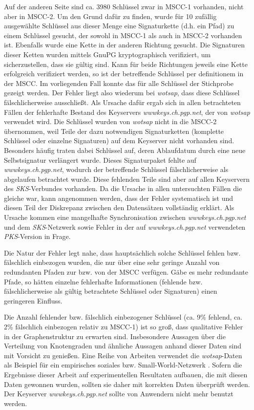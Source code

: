 Auf der anderen Seite sind ca. 3980 Schlüssel zwar in MSCC-1
vorhanden, nicht aber in MSCC-2. Um den Grund dafür zu finden, wurde
für 10 zufällig ausgewählte Schlüssel aus dieser Menge eine
Signaturkette (d.h. ein Pfad) zu einem Schlüssel gesucht, der sowohl
in MSCC-1 als auch in MSCC-2 vorhanden ist. Ebenfalls wurde eine Kette
in der anderen Richtung gesucht. Die Signaturen dieser Ketten wurden
mittels GnuPG kryptographisch verifiziert, um sicherzustellen, dass
sie gültig sind. Kann für beide Richtungen jeweils eine Kette
erfolgreich verifiziert werden, so ist der betreffende Schlüssel per
definitionem in der MSCC. Im vorliegenden Fall konnte das für alle
Schlüssel der Stichprobe gezeigt werden. Der Fehler liegt also
wiederum bei \emph{wotsap}, dass diese Schlüssel fälschlicherweise
ausschließt. Als Ursache dafür ergab sich in allen betrachteten
Fällen der fehlerhafte Bestand des Keyservers
\emph{wwwkeys.ch.pgp.net}, der von \emph{wotsap} verwendet wird. Die
Schlüssel wurden von \emph{wotsap} nicht in die MSCC-2 übernommen,
weil Teile der dazu notwendigen Signaturketten (komplette Schlüssel
oder einzelne Signaturen) auf dem Keyserver nicht vorhanden
sind. Besonders häufig traten dabei Schlüssel auf, deren
Ablaufdatum durch eine neue Selbstsignatur verlängert wurde. Dieses
Signaturpaket fehlte auf \emph{wwwkeys.ch.pgp.net}, wodurch der
betreffende Schlüssel fälschlicherweise als abgelaufen betrachtet
wurde. Diese fehlenden Teile sind aber auf allen Keyservern des
\emph{SKS}-Verbundes %
vorhanden. Da die Ursache in allen untersuchten Fällen die gleiche
war, kann angenommen werden, dass der Fehler systematisch ist und
diesen Teil der Diskrepanz zwischen den Datensätzen vollständig
erklärt. Als Ursache kommen eine mangelhafte Synchronisation
zwischen \emph{wwwkeys.ch.pgp.net} und dem \emph{SKS}-Netzwerk sowie
Fehler in der auf \emph{wwwkeys.ch.pgp.net} verwendeten
\emph{PKS}-Version in Frage.

Die Natur der Fehler legt nahe, dass hauptsächlich solche Schlüssel
fehlen bzw. fälschlich einbezogen wurden, die nur über eine sehr
geringe Anzahl von redundanten Pfaden zur bzw. von der MSCC
verfügen. Gäbe es mehr redundante Pfade, so hätten einzelne
fehlerhafte Informationen (fehlende bzw. fälschlicherweise als gültig
betrachtete Schlüssel oder Signaturen) einen geringeren Einfluss.

Die Anzahl fehlender bzw. fälschlich einbezogener Schlüssel (ca. 9\%
fehlend, ca. 2\% fälschlich einbezogen relativ zu MSCC-1) ist so
groß, dass qualitative Fehler in der Graphenstruktur zu erwarten
sind. Insbesondere Aussagen über die Verteilung von Knotengraden und
ähnliche Aussagen anhand dieser Daten sind mit Vorsicht zu
genießen. Eine Reihe von Arbeiten verwendet die \emph{wotsap}-Daten
als Beispiel für ein empirisches soziales bzw. Small-World-Netzwerk
\cite{Brondsema2006} \cite{Heikkila2009} \cite{Dell'Amico2007}. Sofern
die Ergebnisse dieser Arbeit auf experimentellen Resultaten aufbauen,
die mit diesen Daten gewonnen wurden, sollten sie daher mit korrekten
Daten überprüft werden. Der Keyserver \emph{wwwkeys.ch.pgp.net} sollte
von Anwendern nicht mehr benutzt werden.

